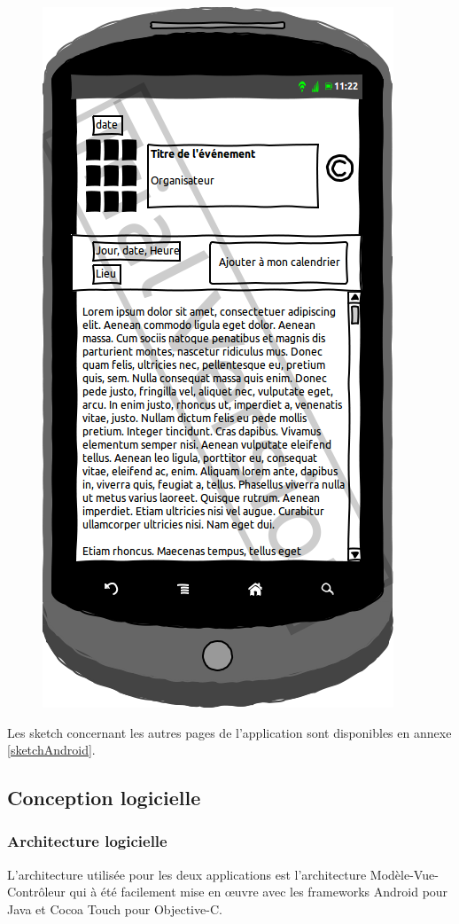 \documentclass[a4paper, 11px]{article}
\begin{document}
\begin{figure}[htbp]
\begin{minipage}[c]{.50\linewidth}
\begin{center}
			\includegraphics[scale=0.3]{../../Sketch/Android/DescrEvent.png}
		\end{center}
	\end{minipage}
\end{figure}
Les sketch concernant les autres pages de l'application sont disponibles en annexe \ref{sketchAndroid}.
\vfill
\clearpage





\subsection{Conception logicielle}

\subsubsection{Architecture logicielle}
L'architecture utilisée pour les deux applications est l'architecture Modèle-Vue-Contrôleur qui à été facilement mise en œuvre avec les frameworks Android pour Java et Cocoa Touch pour Objective-C.
\end{document}
